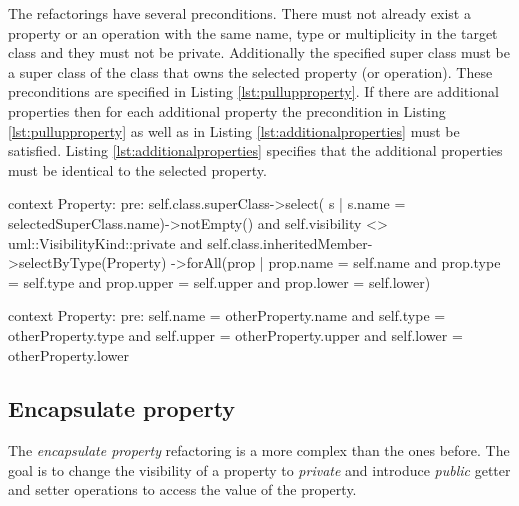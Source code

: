 \documentclass{llncs}
\begin{document}
The refactorings have several preconditions. There must not already exist a property or an operation with the same name, type or 
multiplicity in the target class and they must not be private. Additionally the specified super class must be a super class of the
class that owns the selected property (or operation). These preconditions are specified in Listing \ref{lst:pullupproperty}. If there are 
additional properties then for each additional property the precondition in Listing \ref{lst:pullupproperty} as well as in Listing 
\ref{lst:additionalproperties} must be satisfied. Listing \ref{lst:additionalproperties} specifies that the additional properties must be
identical to the selected property.

\begin{lstsingle}[language=OCL,caption=OCL for \textit{pull up property},label=lst:pullupproperty]
context Property:
pre: self.class.superClass->select(
         s | s.name = selectedSuperClass.name)->notEmpty()
     and self.visibility <> uml::VisibilityKind::private
     and self.class.inheritedMember->selectByType(Property)
     ->forAll(prop | prop.name = self.name
              and prop.type = self.type
              and prop.upper = self.upper
              and prop.lower = self.lower)
\end{lstsingle}

\begin{lstsingle}[language=OCL, caption={OCL for additional properties}, label=lst:additionalproperties]
context Property:
pre: self.name = otherProperty.name
     and self.type = otherProperty.type
     and self.upper = otherProperty.upper
     and self.lower = otherProperty.lower
\end{lstsingle}

\subsection{Encapsulate property}
\label{sec:encapsulate}
The \textit{encapsulate property} refactoring is a more complex than the ones before. The goal is to change the visibility of a property to 
\textit{private} and introduce \textit{public} getter and setter operations to access the value of the property. 
\end{document}
